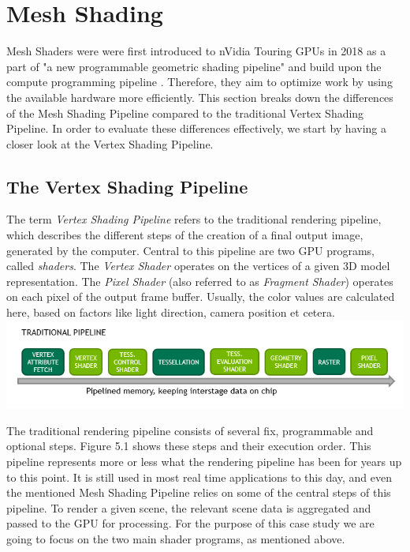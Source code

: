 \chapter{Mesh Shading}


Mesh Shaders were were first introduced to nVidia Touring \ac{GPU}s in 2018 as a part of
"a new programmable geometric shading pipeline" and build upon the compute programming 
pipeline \cite[Christoph Kubisch]{Kubisch2018}. Therefore, they aim to optimize work by 
using the available hardware more efficiently. This section breaks down the differences 
of the Mesh Shading Pipeline compared to the traditional Vertex Shading Pipeline. In order 
to evaluate these differences effectively, we start by having a closer look at the 
Vertex Shading Pipeline.

\section{The Vertex Shading Pipeline}

The term \emph{Vertex Shading Pipeline} refers to the traditional rendering pipeline, which 
describes the different steps of the creation of a final output image, generated by the 
computer. Central to this pipeline are two \ac{GPU} programs, called \emph{shaders}. The 
\emph{Vertex Shader} operates on the vertices of a given 3D model representation. 
The \emph{Pixel Shader} (also referred to as \emph{Fragment Shader}) operates on each pixel 
of the output frame buffer. Usually, the color values are calculated here, based on factors 
like light direction, camera position et cetera. \\

\includegraphics[width=\linewidth]{images/graphics/traditional-rendering-pipeline.png} %

\noindent
The traditional rendering pipeline consists of several fix, programmable and optional steps.
Figure 5.1 shows these steps and their execution order. This pipeline represents more or less   %
what the rendering pipeline has been for years up to this point. It is still used in most 
real time applications to this day, and even the mentioned Mesh Shading Pipeline relies on some of 
the central steps of this pipeline. To render a given scene, the relevant scene data is aggregated 
and passed to the \ac{GPU} for processing. For the purpose of this case study we are going to focus 
on the two main shader programs, as mentioned above. \\

